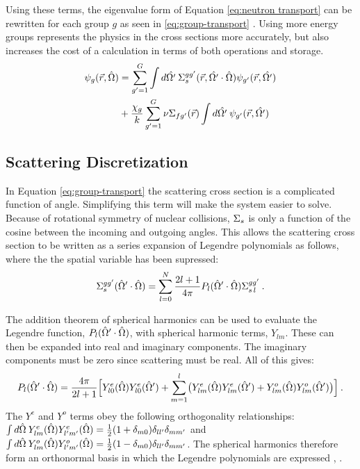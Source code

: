 \noindent Using these terms, the eigenvalue form of Equation \eqref{eq:neutron transport} can be rewritten for each group $g$ as seen in \eqref{eq:group-transport} \cite{Lewis1993}. Using more energy groups represents the physics in the cross sections more accurately, but also increases the cost of a calculation in terms of both operations and storage. 
% 
\begin{align}
   [\hat{\Omega} \cdot \nabla + \Macro_{g}(\vec{r})] \psi_{g}(\vec{r}, \hat{\Omega})  &=  \sum_{g'=1}^{G} \int d\hat{\Omega'} \:\Macro_s^{gg'}(\vec{r}, \hat{\Omega'} \cdot \hat{\Omega}) \psi_{g'}(\vec{r}, \hat{\Omega'})  \nonumber \\
&+ \frac{\chi_{g}}{k}   \sum_{g'=1}^{G} \nu \Macro_{fg'}(\vec{r}) \int d\hat{\Omega'} \:\psi_{g'}(\vec{r}, \hat{\Omega'}) 
\label{eq:group-transport}
\end{align}

\subsection{Scattering Discretization}
In Equation \eqref{eq:group-transport} the scattering cross section is a complicated function of angle. Simplifying this term will make the system easier to solve. Because of rotational symmetry of nuclear collisions, $\Sigma_{s}$ is only a function of the cosine between the incoming and outgoing angles. This allows the scattering cross section to be written as a series expansion of Legendre polynomials as follows, where the the spatial variable has been supressed:
%
\begin{equation}
  \Sigma^{gg'}_{s\,}(\hat{\Omega}' \cdot \hat{\Omega}) = \sum_{l=0}^{N} \frac{2l+1}{4\pi} P_{l}(\hat{\Omega}' \cdot \hat{\Omega})\Sigma^{gg'}_{s\,l} \:.
\end{equation}

The addition theorem of spherical harmonics can be used to evaluate the Legendre function, $P_{l}(\hat{\Omega}' \cdot \hat{\Omega})$, with spherical harmonic terms, $Y_{lm}$. These can then be expanded into real and imaginary components. The imaginary components must be zero since scattering must be real. All of this gives:
%
\begin{equation}
  P_l(\hat{\Omega}' \cdot \hat{\Omega}) = \frac{4\pi}{2l+1} \Bigl[ Y^e_{l0}(\hat{\Omega}) Y^e_{l0}(\hat{\Omega}') + \sum_{m=1}^l \bigl( Y^e_{lm}(\hat{\Omega}) Y^e_{lm}(\hat{\Omega}') + Y^o_{lm}(\hat{\Omega}) Y^o_{lm}(\hat{\Omega}') \bigr) \Bigr]\:.
\end{equation}
%
The $Y^e$ and $Y^o$ terms obey the following orthogonality relationships: $\int d\hat{\Omega} \:Y^{e}_{lm}(\hat{\Omega})Y^{e}_{l'm'}(\hat{\Omega}) = \frac{1}{2}(1 + \delta_{m0})\delta_{ll'}\delta_{mm'}$ and $\int d\hat{\Omega} \:Y^{o}_{lm}(\hat{\Omega})Y^{o}_{l'm'}(\hat{\Omega}) = \frac{1}{2}(1 - \delta_{m0})\delta_{ll'}\delta_{mm'}$. The spherical harmonics therefore form an orthonormal basis in which the Legendre polynomials are expressed \cite{Evans2009}, \cite{Lewis1993}. 

